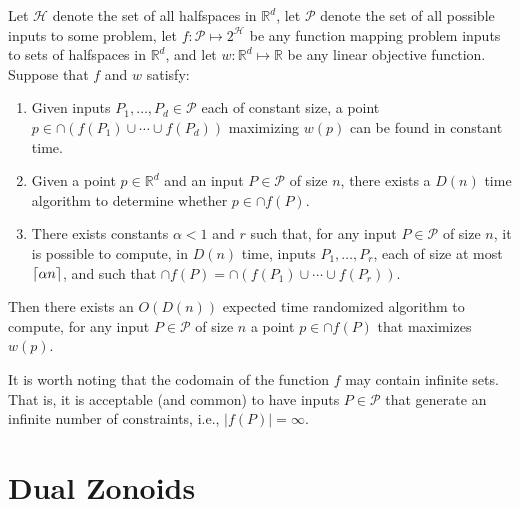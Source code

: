 \documentclass[lotsofwhite]{patmorin}
\begin{document}
\begin{thm}[Chan 2004]
Let $\mathcal{H}$ denote the set of all halfspaces in $\mathbb{R}^d$,
let $\mathcal{P}$ denote the set of all possible inputs to some problem, 
let $f:\mathcal{P}\mapsto 2^{\mathcal{H}}$ be any function mapping 
problem inputs to sets of halfspaces in $\mathbb{R}^d$,
and let $w:\mathbb{R}^d\mapsto \mathbb{R}$ be
any linear objective function.  Suppose that $f$ and $w$ satisfy:
\begin{enumerate}

\item Given inputs $P_1,\ldots,P_d\in\mathcal{P}$ each of constant
size, a point $p\in\cap (f(P_1)\cup\cdots\cup f(P_d))$ maximizing
$w(p)$ can be found in constant time.

\item Given a point $p\in\mathbb{R}^d$ and an input $P\in\mathcal{P}$
of size $n$, there exists a $D(n)$ time algorithm to determine whether
$p\in\cap f(P)$.

\item There exists constants $\alpha < 1$ and $r$ such that, for any
input $P\in\mathcal{P}$ of size $n$, it is possible to compute, in
$D(n)$ time, inputs $P_1,\ldots,P_r$, each of size at most
$\left\lceil \alpha n \right\rceil$, and such that $\cap f(P) =
\cap(f(P_1)\cup\cdots\cup f(P_r))$.

\end{enumerate}
Then there exists an $O(D(n))$ expected time randomized algorithm to
compute, for any input $P\in\mathcal{P}$ of size $n$ a point
$p\in\cap f(P)$ that maximizes $w(p)$.
\end{thm}

It is worth noting that the codomain of the function $f$ may contain
infinite sets.  That is, it is acceptable (and common) to have inputs
$P\in\mathcal{P}$ that generate an infinite number of constraints,
i.e., $|f(P)|=\infty$.


\section{Dual Zonoids}
\end{document}
